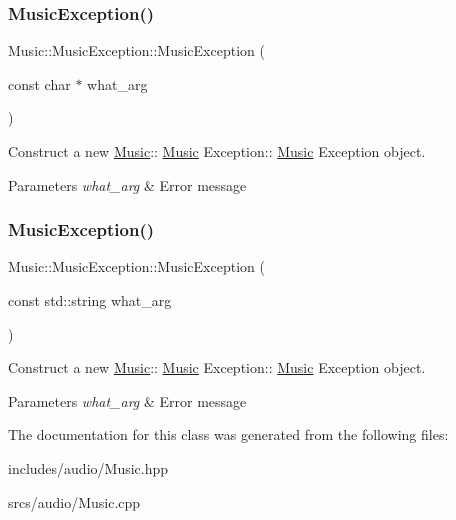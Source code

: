 \subsubsection{\texorpdfstring{Music\+Exception()}{MusicException()}\hspace{0.1cm}{\footnotesize\ttfamily [1/2]}}
{\footnotesize\ttfamily Music\+::\+Music\+Exception\+::\+Music\+Exception (\begin{DoxyParamCaption}\item[{const char $\ast$}]{what\+\_\+arg }\end{DoxyParamCaption})\hspace{0.3cm}{\ttfamily [explicit]}}



Construct a new \hyperlink{class_music}{Music}\+:\+: \hyperlink{class_music}{Music} Exception\+:\+: \hyperlink{class_music}{Music} Exception object. 


\begin{DoxyParams}{Parameters}
{\em what\+\_\+arg} & Error message \\
\hline
\end{DoxyParams}
\mbox{\label{class_music_1_1_music_exception_a4bbf9e4a506fcb9d41eb87f0b1c642ba}} 
\subsubsection{\texorpdfstring{Music\+Exception()}{MusicException()}\hspace{0.1cm}{\footnotesize\ttfamily [2/2]}}
{\footnotesize\ttfamily Music\+::\+Music\+Exception\+::\+Music\+Exception (\begin{DoxyParamCaption}\item[{const std\+::string}]{what\+\_\+arg }\end{DoxyParamCaption})\hspace{0.3cm}{\ttfamily [explicit]}}



Construct a new \hyperlink{class_music}{Music}\+:\+: \hyperlink{class_music}{Music} Exception\+:\+: \hyperlink{class_music}{Music} Exception object. 


\begin{DoxyParams}{Parameters}
{\em what\+\_\+arg} & Error message \\
\hline
\end{DoxyParams}


The documentation for this class was generated from the following files\+:\begin{DoxyCompactItemize}
\item 
includes/audio/Music.\+hpp\item 
srcs/audio/Music.\+cpp\end{DoxyCompactItemize}
